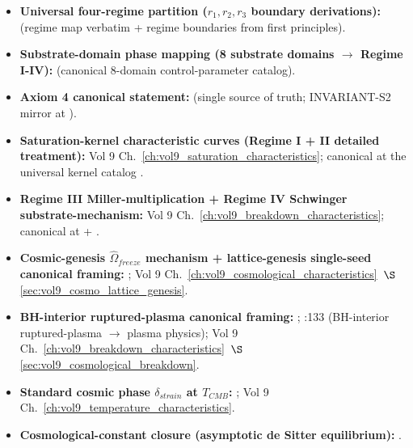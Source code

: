 \begin{itemize}
    \item \textbf{Universal four-regime partition ($r_1, r_2, r_3$ boundary derivations):}  (regime map verbatim + regime boundaries from first principles).
    \item \textbf{Substrate-domain phase mapping (8 substrate domains $\to$ Regime I-IV):}  (canonical 8-domain control-parameter catalog).
    \item \textbf{Axiom 4 canonical statement:}  (single source of truth; INVARIANT-S2 mirror at ).
    \item \textbf{Saturation-kernel characteristic curves (Regime I + II detailed treatment):} Vol 9 Ch.~\ref{ch:vol9_saturation_characteristics}; canonical at the universal kernel catalog .
    \item \textbf{Regime III Miller-multiplication + Regime IV Schwinger substrate-mechanism:} Vol 9 Ch.~\ref{ch:vol9_breakdown_characteristics}; canonical at  + .
    \item \textbf{Cosmic-genesis $\hat{\Omega}_{freeze}$ mechanism + lattice-genesis single-seed canonical framing:} ; Vol 9 Ch.~\ref{ch:vol9_cosmological_characteristics}~$\S$\ref{sec:vol9_cosmo_lattice_genesis}.
    \item \textbf{BH-interior ruptured-plasma canonical framing:} ; :133 (BH-interior ruptured-plasma $\to$ plasma physics); Vol 9 Ch.~\ref{ch:vol9_breakdown_characteristics}~$\S$\ref{sec:vol9_cosmological_breakdown}.
    \item \textbf{Standard cosmic phase $\delta_{strain}$ at $T_{CMB}$:} ; Vol 9 Ch.~\ref{ch:vol9_temperature_characteristics}.
    \item \textbf{Cosmological-constant closure (asymptotic de Sitter equilibrium):} .

\end{itemize}
